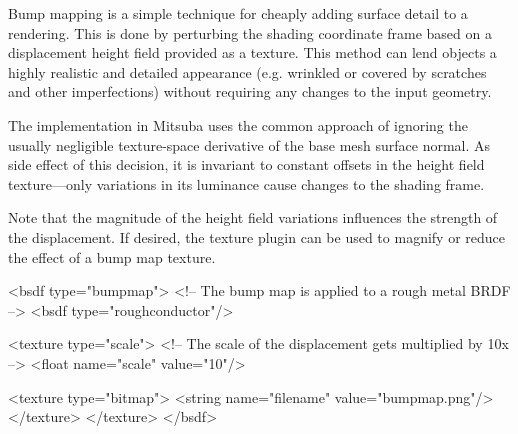 
Bump mapping \cite{Blinn1978Simulation} is a simple technique for cheaply
adding surface detail to a rendering. This is done by perturbing the
shading coordinate frame based on a displacement height field provided
as a texture. This method can lend objects a highly realistic and detailed
appearance (e.g. wrinkled or covered by scratches and other imperfections)
without requiring any changes to the input geometry.

The implementation in Mitsuba uses the common approach of ignoring
the usually negligible texture-space derivative of the base mesh
surface normal. As side effect of this decision, it is invariant
to constant offsets in the height field texture---only variations in
its luminance cause changes to the shading frame.

Note that the magnitude of the height field variations influences
the strength of the displacement. If desired, the 
texture plugin can be used to magnify or reduce the effect of a
bump map texture.
\begin{xml}[caption=A rough metal model with a scaled image-based bump map]
<bsdf type="bumpmap">
    <!-- The bump map is applied to a rough metal BRDF -->
    <bsdf type="roughconductor"/>

    <texture type="scale">
        <!-- The scale of the displacement gets multiplied by 10x -->
        <float name="scale" value="10"/>

        <texture type="bitmap">
            <string name="filename" value="bumpmap.png"/>
        </texture>
    </texture>
</bsdf>
\end{xml}


